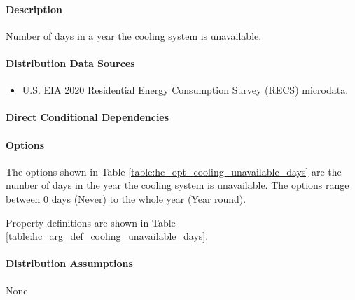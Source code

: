 \paragraph{Description}
% 
Number of days in a year the cooling system is unavailable.

\paragraph{Distribution Data Sources}
% 
\begin{itemize}
	\item U.S. EIA 2020 Residential Energy Consumption Survey (RECS) microdata.
\end{itemize}

\paragraph{Direct Conditional Dependencies}


\paragraph{Options}
The options shown in Table \ref{table:hc_opt_cooling_unavailable_days} are the number of days in the year the cooling system is unavailable. The options range between 0 days (Never) to the whole year (Year round).



Property definitions are shown in Table \ref{table:hc_arg_def_cooling_unavailable_days}.



\paragraph{Distribution Assumptions}
% 
None
